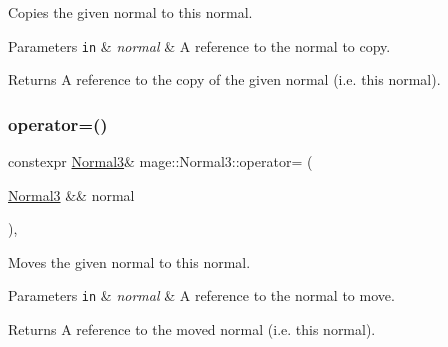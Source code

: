 Copies the given normal to this normal.


\begin{DoxyParams}[1]{Parameters}
\mbox{\tt in}  & {\em normal} & A reference to the normal to copy. \\
\hline
\end{DoxyParams}
\begin{DoxyReturn}{Returns}
A reference to the copy of the given normal (i.\+e. this normal). 
\end{DoxyReturn}
\mbox{\label{structmage_1_1_normal3_a59aca1c2a1eb936c36bce64b4b5936b9}} 
\subsubsection{\texorpdfstring{operator=()}{operator=()}\hspace{0.1cm}{\footnotesize\ttfamily [2/2]}}
{\footnotesize\ttfamily constexpr \mbox{\hyperlink{structmage_1_1_normal3}{Normal3}}\& mage\+::\+Normal3\+::operator= (\begin{DoxyParamCaption}\item[{\mbox{\hyperlink{structmage_1_1_normal3}{Normal3}} \&\&}]{normal }\end{DoxyParamCaption})\hspace{0.3cm}{\ttfamily [default]}, {\ttfamily [noexcept]}}

Moves the given normal to this normal.


\begin{DoxyParams}[1]{Parameters}
\mbox{\tt in}  & {\em normal} & A reference to the normal to move. \\
\hline
\end{DoxyParams}
\begin{DoxyReturn}{Returns}
A reference to the moved normal (i.\+e. this normal). 
\end{DoxyReturn}
